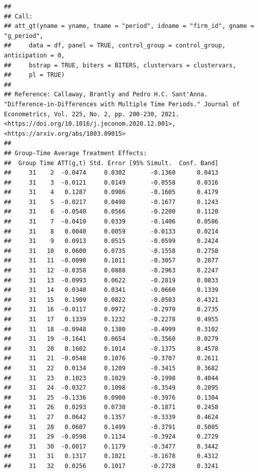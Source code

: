 \documentclass[
]{article}
\begin{document}
\begin{verbatim}
## 
## Call:
## att_gt(yname = yname, tname = "period", idname = "firm_id", gname = "g_period", 
##     data = df, panel = TRUE, control_group = control_group, anticipation = 0, 
##     bstrap = TRUE, biters = BITERS, clustervars = clustervars, 
##     pl = TRUE)
## 
## Reference: Callaway, Brantly and Pedro H.C. Sant'Anna.  "Difference-in-Differences with Multiple Time Periods." Journal of Econometrics, Vol. 225, No. 2, pp. 200-230, 2021. <https://doi.org/10.1016/j.jeconom.2020.12.001>, <https://arxiv.org/abs/1803.09015> 
## 
## Group-Time Average Treatment Effects:
##  Group Time ATT(g,t) Std. Error [95% Simult.  Conf. Band]  
##     31    2  -0.0474     0.0302       -0.1360      0.0413  
##     31    3  -0.0121     0.0149       -0.0558      0.0316  
##     31    4   0.1287     0.0986       -0.1605      0.4179  
##     31    5  -0.0217     0.0498       -0.1677      0.1243  
##     31    6  -0.0540     0.0566       -0.2200      0.1120  
##     31    7  -0.0410     0.0339       -0.1406      0.0586  
##     31    8   0.0040     0.0059       -0.0133      0.0214  
##     31    9   0.0913     0.0515       -0.0599      0.2424  
##     31   10   0.0600     0.0735       -0.1558      0.2758  
##     31   11  -0.0090     0.1011       -0.3057      0.2877  
##     31   12  -0.0358     0.0888       -0.2963      0.2247  
##     31   13  -0.0993     0.0622       -0.2819      0.0833  
##     31   14   0.0340     0.0341       -0.0660      0.1339  
##     31   15   0.1909     0.0822       -0.0503      0.4321  
##     31   16  -0.0117     0.0972       -0.2970      0.2735  
##     31   17   0.1339     0.1232       -0.2278      0.4955  
##     31   18  -0.0948     0.1380       -0.4999      0.3102  
##     31   19  -0.1641     0.0654       -0.3560      0.0279  
##     31   20   0.1602     0.1014       -0.1375      0.4578  
##     31   21  -0.0548     0.1076       -0.3707      0.2611  
##     31   22   0.0134     0.1209       -0.3415      0.3682  
##     31   23   0.1023     0.1029       -0.1998      0.4044  
##     31   24  -0.0327     0.1098       -0.3549      0.2895  
##     31   25  -0.1336     0.0900       -0.3976      0.1304  
##     31   26   0.0293     0.0738       -0.1871      0.2458  
##     31   27   0.0642     0.1357       -0.3339      0.4624  
##     31   28   0.0607     0.1499       -0.3791      0.5005  
##     31   29  -0.0598     0.1134       -0.3924      0.2729  
##     31   30  -0.0017     0.1179       -0.3477      0.3442  
##     31   31   0.1317     0.1021       -0.1678      0.4312  
##     31   32   0.0256     0.1017       -0.2728      0.3241  

\end{verbatim}
\end{document}
